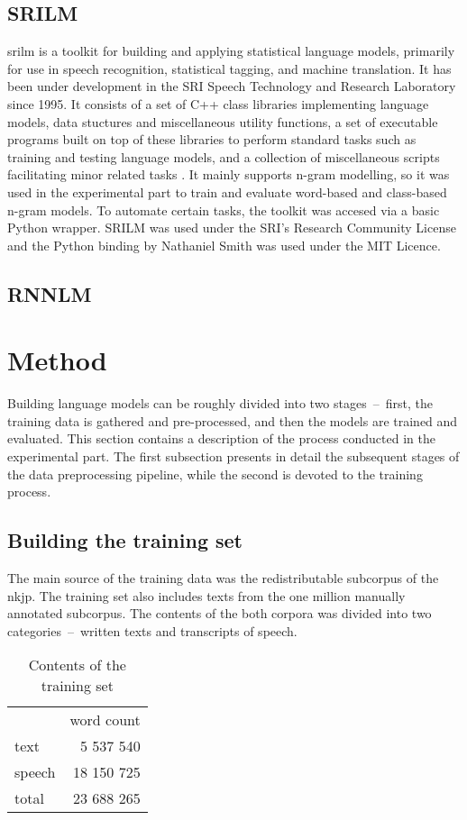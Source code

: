 \subsection{SRILM}
\gls{srilm} is a toolkit for building and applying statistical language models, primarily for use in speech recognition, statistical tagging, and machine translation. It has been under development in the SRI Speech Technology and Research Laboratory since 1995. It consists of a set of C++ class libraries implementing language models, data stuctures and miscellaneous utility functions, a set of executable programs built on top of these libraries to perform standard tasks such as training and testing language models, and a collection of miscellaneous scripts facilitating minor related tasks \cite{stolcke2011srilm}. It mainly supports n-gram modelling, so it was used in the experimental part to train and evaluate word-based and class-based n-gram models. To automate certain tasks, the toolkit was accesed via a basic Python wrapper. SRILM was used under the SRI's Research Community License and the Python binding by Nathaniel Smith was used under the MIT Licence.
\subsection{RNNLM}
\section{Method}
Building language models can be roughly divided into two stages~--~first, the training data is gathered and pre-processed, and then the models are trained and evaluated. This section contains a description of the process conducted in the experimental part. The first subsection presents in detail the subsequent stages of the data preprocessing pipeline, while the second is devoted to the training process.
\subsection{Building the training set}
\label{subsection:trainingset}
The main source of the training data was the redistributable subcorpus of the \gls{nkjp}. The training set also includes texts from the one million manually annotated subcorpus. The contents of the both corpora was divided into two categories~--~written texts and transcripts of speech.
\begin{table}[!htbp]
	\centering
	\caption{Contents of the training set}
	\begin{tabular*}{.4\linewidth}{@{\extracolsep{\fill}}lr}
		{}        & \multicolumn{1}{c}{word count} \\
		text   & 5 537 540  \\
	        speech & 18 150 725 \\
                total  & 23 688 265 \\
	\end{tabular*}
\end{table}

